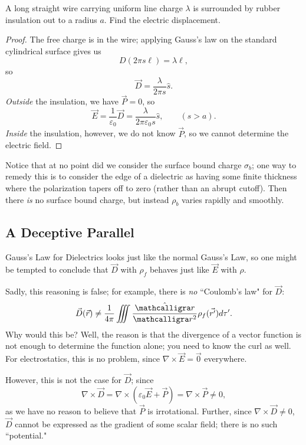 \begin{example}
A long straight wire carrying uniform line charge $\lambda$ is surrounded by rubber insulation out to a radius $a$. Find the electric displacement.
\end{example}

\begin{proof}
The free charge is in the wire; applying Gauss's law on the standard cylindrical surface gives us
\[D(2\pi s\ell)=\lambda\ell,\]
so
\[\vec{D}=\frac{\lambda}{2\pi s}\hat{s}.\]
\textit{Outside} the insulation, we have $\vec{P}=0$, so
\[\vec{E}=\frac{1}{\varepsilon_0}\vec{D}=\frac{\lambda}{2\pi\varepsilon_0 s}\hat{s}, \qquad (s>a).\]
\textit{Inside} the insulation, however, we do not know $\vec{P}$, so we cannot determine the electric field.
\end{proof}

Notice that at no point did we consider the surface bound charge $\sigma_b$; one way to remedy this is to consider the edge of a dielectric as having some finite thickness where the polarization tapers off to zero (rather than an abrupt cutoff). Then there \textit{is} no surface bound charge, but instead $\rho_b$ varies rapidly and smoothly.

\subsection{A Deceptive Parallel}\label{deceptiveparallel}

Gauss's Law for Dielectrics looks just like the normal Gauss's Law, so one might be tempted to conclude that $\vec{D}$ with $\rho_f$ behaves just like $\vec{E}$ with $\rho$.

Sadly, this reasoning is false; for example, there is \textit{no} ``Coulomb's law" for $\vec{D}$:
\[\vec{D}(\vec{r})\neq \frac{1}{4\pi}\iiint \frac{\hat{\scr}}{\scr^2}\rho_f(\vec{r'})d\tau'.\]
Why would this be? Well, the reason is that the divergence of a vector function is not enough to determine the function alone; you need to know the curl as well. For electrostatics, this is no problem, since $\nabla\times \vec{E}=\vec{0}$ everywhere.

However, this is not the case for $\vec{D}$; since
\[\nabla\times \vec{D}=\nabla\times(\varepsilon_0\vec{E}+\vec{P})=\nabla\times\vec{P}\neq 0,\]
as we have no reason to believe that $\vec{P}$ is irrotational.  Further, since $\nabla\times\vec{D}\neq 0$, $\vec{D}$ cannot be expressed as the gradient of some scalar field; there is no such ``potential."

